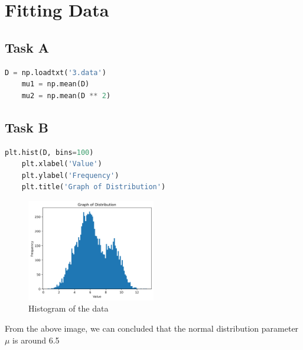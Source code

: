 \section{Fitting Data}
\subsection*{Task A}
\begin{lstlisting}[language=Python, caption={Python code to calculate $\mu_1$ and $\mu_2$}, label=lst:sendy-two]
	D = np.loadtxt('3.data')
	mu1 = np.mean(D)
	mu2 = np.mean(D ** 2)
\end{lstlisting}
\subsection*{Task B}
\begin{lstlisting}[language=Python, caption={Python code to create the Histogram}, label=lst:sendy-one]
	plt.hist(D, bins=100)
	plt.xlabel('Value')
	plt.ylabel('Frequency')
	plt.title('Graph of Distribution')
\end{lstlisting}
\begin{figure}[H]
	\centering
	\includegraphics[width=0.5\textwidth]{images/3b.png}
	\caption{Histogram of the data}
\end{figure}
From the above image, we can concluded that the normal distribution parameter $\mu$ is around 6.5
